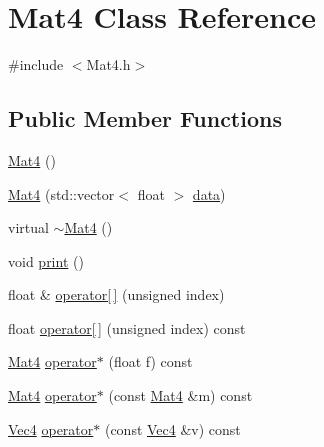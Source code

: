 \hypertarget{class_mat4}{}\section{Mat4 Class Reference}
\label{class_mat4}


{\ttfamily \#include $<$Mat4.\+h$>$}

\subsection*{Public Member Functions}
\begin{DoxyCompactItemize}
\item 
\hyperlink{class_mat4_a53cb3c6c2a0b594345f0107b6c1fcc37}{Mat4} ()
\item 
\hyperlink{class_mat4_a32caffc8ac276557413ca5102636b7c9}{Mat4} (std\+::vector$<$ float $>$ \hyperlink{class_mat4_a17fc0871d2d85f19636a2fd5b788b2ad}{data})
\item 
virtual \hyperlink{class_mat4_a54fcf133dbe085cdddb1dee9e500f154}{$\sim$\+Mat4} ()
\item 
void \hyperlink{class_mat4_af527d1ca1b686dfaa54c066a6471cc10}{print} ()
\item 
float \& \hyperlink{class_mat4_a59f6dd1514b3573d4b6cb569d3aedf25}{operator\mbox{[}$\,$\mbox{]}} (unsigned index)
\item 
float \hyperlink{class_mat4_abcd72b81217f7031aa66b472ab9133fc}{operator\mbox{[}$\,$\mbox{]}} (unsigned index) const 
\item 
\hyperlink{class_mat4}{Mat4} \hyperlink{class_mat4_a7fcb0d56924724d824b575ac30ca7ca6}{operator$\ast$} (float f) const 
\item 
\hyperlink{class_mat4}{Mat4} \hyperlink{class_mat4_a183d663f654f983eaf0d9a200687ec62}{operator$\ast$} (const \hyperlink{class_mat4}{Mat4} \&m) const 
\item 
\hyperlink{class_vec4}{Vec4} \hyperlink{class_mat4_a24ded678a14c7c5c300ad8148a2a6656}{operator$\ast$} (const \hyperlink{class_vec4}{Vec4} \&v) const 
\end{DoxyCompactItemize}
